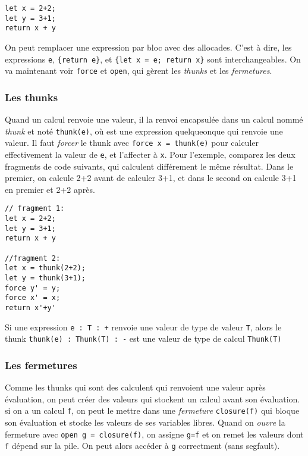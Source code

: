\documentclass[
]{article}
\begin{document}
\begin{verbatim}
let x = 2+2;
let y = 3+1;
return x + y
\end{verbatim}

On peut remplacer une expression par bloc avec des allocades. C'est à
dire, les expressions \texttt{e}, \texttt{\{return\ e\}}, et
\texttt{\{let\ x\ =\ e;\ return\ x\}} sont interchangeables. On va
maintenant voir \texttt{force} et \texttt{open}, qui gèrent les
\emph{thunks} et les \emph{fermetures}.

\hypertarget{les-thunks}{%
\subsubsection{Les thunks}\label{les-thunks}}

Quand un calcul renvoie une valeur, il la renvoi encapsulée dans un
calcul nommé \emph{thunk} et noté \texttt{thunk(e)}, où est une
expression quelqueonque qui renvoie une valeur. Il faut \emph{forcer} le
thunk avec \texttt{force\ x\ =\ thunk(e)} pour calculer effectivement la
valeur de \texttt{e}, et l'affecter à \texttt{x}. Pour l'exemple,
comparez les deux fragments de code suivants, qui calculent différement
le même résultat. Dans le premier, on calcule 2+2 avant de calculer 3+1,
et dans le second on calcule 3+1 en premier et 2+2 après.

\begin{verbatim}
// fragment 1:
let x = 2+2;
let y = 3+1;
return x + y 
  
//fragment 2:
let x = thunk(2+2);
let y = thunk(3+1);
force y' = y;
force x' = x;
return x'+y'
\end{verbatim}

Si une expression \texttt{e\ :\ T\ :\ +} renvoie une valeur de type de
valeur \texttt{T}, alors le thunk \texttt{thunk(e)\ :\ Thunk(T)\ :\ -}
est une valeur de type de calcul \texttt{Thunk(T)}

\hypertarget{les-fermetures}{%
\subsubsection{Les fermetures}\label{les-fermetures}}

Comme les thunks qui sont des calculent qui renvoient une valeur après
évaluation, on peut créer des valeurs qui stockent un calcul avant son
évaluation. si on a un calcul \texttt{f}, on peut le mettre dans une
\emph{fermeture} \texttt{closure(f)} qui bloque son évaluation et stocke
les valeurs de ses variables libres. Quand on \emph{ouvre} la fermeture
avec \texttt{open\ g\ =\ closure(f)}, on assigne \texttt{g=f} et on
remet les valeurs dont \texttt{f} dépend sur la pile. On peut alors
accéder à \texttt{g} correctment (sans segfault).
\end{document}
